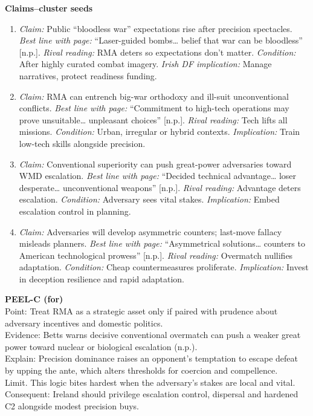 \textbf{Claims–cluster seeds}
\begin{enumerate}
	\item \textit{Claim:} Public “bloodless war” expectations rise after precision spectacles. \textit{Best line with page:} “Laser-guided bombs… belief that war can be bloodless” [n.p.]. \textit{Rival reading:} RMA deters so expectations don’t matter. \textit{Condition:} After highly curated combat imagery. \textit{Irish DF implication:} Manage narratives, protect readiness funding.
	\item \textit{Claim:} RMA can entrench big-war orthodoxy and ill-suit unconventional conflicts. \textit{Best line with page:} “Commitment to high-tech operations may prove unsuitable… unpleasant choices” [n.p.]. \textit{Rival reading:} Tech lifts all missions. \textit{Condition:} Urban, irregular or hybrid contexts. \textit{Implication:} Train low-tech skills alongside precision.
	\item \textit{Claim:} Conventional superiority can push great-power adversaries toward WMD escalation. \textit{Best line with page:} “Decided technical advantage… loser desperate… unconventional weapons” [n.p.]. \textit{Rival reading:} Advantage deters escalation. \textit{Condition:} Adversary sees vital stakes. \textit{Implication:} Embed escalation control in planning.
	\item \textit{Claim:} Adversaries will develop asymmetric counters; last-move fallacy misleads planners. \textit{Best line with page:} “Asymmetrical solutions… counters to American technological prowess” [n.p.]. \textit{Rival reading:} Overmatch nullifies adaptation. \textit{Condition:} Cheap countermeasures proliferate. \textit{Implication:} Invest in deception resilience and rapid adaptation.
\end{enumerate}

\textbf{PEEL-C (for)}\\
Point: Treat RMA as a strategic asset only if paired with prudence about adversary incentives and domestic politics.\\
Evidence: Betts warns decisive conventional overmatch can push a weaker great power toward nuclear or biological escalation (n.p.).\\
Explain: Precision dominance raises an opponent’s temptation to escape defeat by upping the ante, which alters thresholds for coercion and compellence.\\
Limit. This logic bites hardest when the adversary’s stakes are local and vital.\\
Consequent: Ireland should privilege escalation control, dispersal and hardened C2 alongside modest precision buys.

